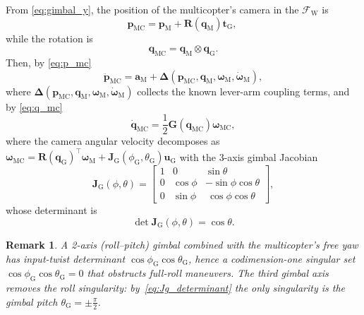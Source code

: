 \documentclass[letterpaper, 10 pt, conference]{ieeeconf}  %
\newtheorem{remark}{Remark}
\begin{document}
From \eqref{eq:gimbal_y}, the position of the multicopter's camera in the $\mathcal{F}_\text{W}$ is 
\begin{equation}\mathbf{p}_\text{MC} = \mathbf{p}_\text{M} + \mathbf{R}(\mathbf{q}_\text{M}) \mathbf{t}_\text{G},\
\label{eq:p_mc}
\end{equation}
while the rotation is 
\begin{equation}
\mathbf{q}_\text{MC} = \mathbf{q}_\text{M} \otimes \mathbf{q}_\text{G}. 
\label{eq:q_mc}
\end{equation}
Then, by \eqref{eq:p_mc}
\begin{equation}
\ddot{\mathbf{p}}_\text{MC} = \mathbf{a}_\text{M} + \boldsymbol{\Delta}(\mathbf{p}_\text{MC}, \mathbf{q}_\text{M}, \boldsymbol{\omega}_\text{M}, \dot{\boldsymbol{\omega}}_\text{M}),
\label{eq:pc_ddot}
\end{equation}
where $\boldsymbol\Delta(\mathbf{p}_\text{MC}, \mathbf{q}_\text{M}, \boldsymbol{\omega}_\text{M}, \dot{\boldsymbol{\omega}}_\text{M})$ collects the known lever-arm coupling terms, and by \eqref{eq:q_mc}
\begin{equation}
\dot{\mathbf{q}}_\text{MC} = \frac{1}{2} \mathbf{G}(\mathbf{q}_\text{MC}) \boldsymbol{\omega}_\text{MC},
\label{eq:qc_dot}
\end{equation}
where the camera angular velocity decomposes as $\boldsymbol{\omega}_\text{MC} = \mathbf{R}(\mathbf{q}_\text{G})^\top \boldsymbol{\omega}_\text{M} + \mathbf{J}_\text{G}(\phi_\text{G}, \theta_\text{G}) \mathbf{u}_\text{G}$ with the 3-axis gimbal Jacobian
\begin{equation}
\mathbf{J}_\text{G}(\phi,\theta)=
\begin{bmatrix}
1 & 0 & \sin\theta\\
0 & \cos\phi & -\sin\phi\cos\theta\\
0 & \sin\phi & \ \cos\phi\cos\theta
\end{bmatrix},
\label{eq:Jg_matrix}
\end{equation}
whose determinant is
\begin{equation}
\det \mathbf{J}_\text{G}(\phi,\theta)=\cos\theta.
\label{eq:Jg_determinant}
\end{equation}

\begin{remark}
A 2-axis (roll--pitch) gimbal combined with the multicopter's free yaw has input-twist determinant $\cos\phi_\text{G}\cos\theta_\text{G}$, hence a codimension-one singular set $\cos\phi_\text{G}\cos\theta_\text{G}=0$ that obstructs full-roll maneuvers. The third gimbal axis removes the roll singularity: by~\eqref{eq:Jg_determinant} the only singularity is the gimbal pitch $\theta_\text{G}=\pm\frac{\pi}{2}$.
\end{remark}
\end{document}
